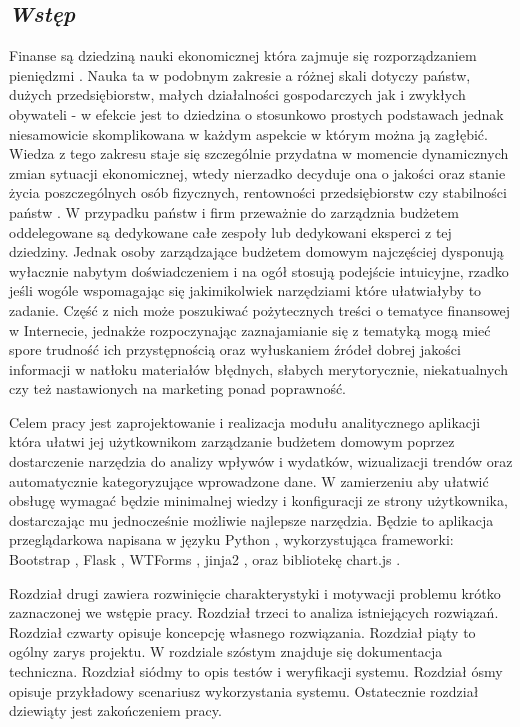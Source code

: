 \documentclass[a4paper,10pt, twoside]{report}
\newcommand{\customstylechapter}[1]{\large{\textit{#1}}}
\begin{document}
\begin{large}
\chapter{\customstylechapter{Wstęp}}
{Finanse są dziedziną nauki ekonomicznej która zajmuje się rozporządzaniem 
pieniędzmi \cite{wiki_ekonomia}. Nauka ta w podobnym zakresie a różnej skali 
dotyczy państw, dużych przedsiębiorstw, małych działalności gospodarczych jak i 
zwykłych obywateli - w efekcie jest to dziedzina o stosunkowo prostych 
podstawach jednak niesamowicie skomplikowana w każdym aspekcie w którym można ją
 zagłębić. Wiedza z tego zakresu staje się szczególnie przydatna w momencie 
dynamicznych zmian sytuacji ekonomicznej, wtedy nierzadko decyduje ona o jakości
 oraz stanie życia poszczególnych osób fizycznych, rentowności przedsiębiorstw 
czy stabilności państw \cite{zapaśćekonomiczna}. W przypadku państw i firm 
przeważnie do zarządznia budżetem oddelegowane są dedykowane całe zespoły lub 
dedykowani eksperci z tej dziedziny. Jednak osoby zarządzające budżetem domowym 
najczęściej dysponują wyłacznie nabytym doświadczeniem i na ogół stosują 
podejście intuicyjne, rzadko jeśli wogóle wspomagając się jakimikolwiek 
narzędziami które ułatwiałyby to zadanie. Część z nich może poszukiwać 
pożytecznych treści o tematyce finansowej w Internecie, jednakże rozpoczynając 
zaznajamianie się z tematyką mogą mieć spore trudność ich przystępnością oraz 
wyłuskaniem źródeł dobrej jakości informacji w natłoku materiałów błędnych, 
słabych merytorycznie, niekatualnych czy też nastawionych na marketing ponad 
poprawność.}

\medskip
{Celem pracy jest zaprojektowanie i realizacja modułu analitycznego aplikacji 
która ułatwi jej użytkownikom zarządzanie budżetem domowym poprzez dostarczenie 
narzędzia do analizy wpływów i wydatków, wizualizacji trendów oraz automatycznie 
kategoryzujące wprowadzone dane. W zamierzeniu aby ułatwić obsługę wymagać 
będzie minimalnej wiedzy i konfiguracji ze strony użytkownika, dostarczając mu 
jednocześnie możliwie najlepsze narzędzia. Będzie to aplikacja przeglądarkowa 
napisana w języku Python \cite{Python}\cite{pythonautomate}, wykorzystująca 
frameworki: Bootstrap \cite{Bootstrap}, Flask \cite{Flask}, WTForms 
\cite{WTForms}, jinja2 \cite{jinja}, oraz bibliotekę chart.js \cite{chart.js}.}

\medskip
{Rozdział drugi zawiera rozwinięcie charakterystyki i motywacji problemu krótko 
zaznaczonej we wstępie pracy. Rozdział trzeci to analiza istniejących rozwiązań.
 Rozdział czwarty opisuje koncepcję własnego rozwiązania. Rozdział piąty to 
ogólny zarys projektu. W rozdziale szóstym znajduje się dokumentacja techniczna.
Rozdział siódmy to opis testów i weryfikacji systemu. Rozdział ósmy opisuje 
przykładowy scenariusz wykorzystania systemu. Ostatecznie rozdział dziewiąty 
jest zakończeniem pracy.}


\end{large}
\end{document}
